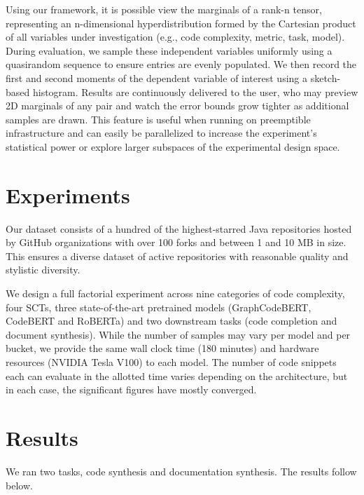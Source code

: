 \documentclass[usenames,dvipsnames]{article} %
\begin{document}
  Using our framework, it is possible view the marginals of a rank-n tensor, representing an n-dimensional hyperdistribution formed by the Cartesian product of all variables under investigation (e.g., code complexity, metric, task, model). During evaluation, we sample these independent variables uniformly using a quasirandom sequence to ensure entries are evenly populated. We then record the first and second moments of the dependent variable of interest using a sketch-based histogram. Results are continuously delivered to the user, who may preview 2D marginals of any pair and watch the error bounds grow tighter as additional samples are drawn. This feature is useful when running on preemptible infrastructure and can easily be parallelized to increase the experiment's statistical power or explore larger subspaces of the experimental design space.

  \section{Experiments}\label{sec:experiments}

  Our dataset consists of a hundred of the highest-starred Java repositories hosted by GitHub organizations with over 100 forks and between 1 and 10 MB in size. This ensures a diverse dataset of active repositories with reasonable quality and stylistic diversity.

  We design a full factorial experiment across nine categories of code complexity, four SCTs, three state-of-the-art pretrained models (GraphCodeBERT, CodeBERT and RoBERTa) and two downstream tasks (code completion and document synthesis). While the number of samples may vary per model and per bucket, we provide the same wall clock time (180 minutes) and hardware resources (NVIDIA Tesla V100) to each model. The number of code snippets each can evaluate in the allotted time varies depending on the architecture, but in each case, the significant figures have mostly converged.

  \pagebreak\section{Results}\label{sec:results}

  We ran two tasks, code synthesis and documentation synthesis. The results follow below.
\end{document}

